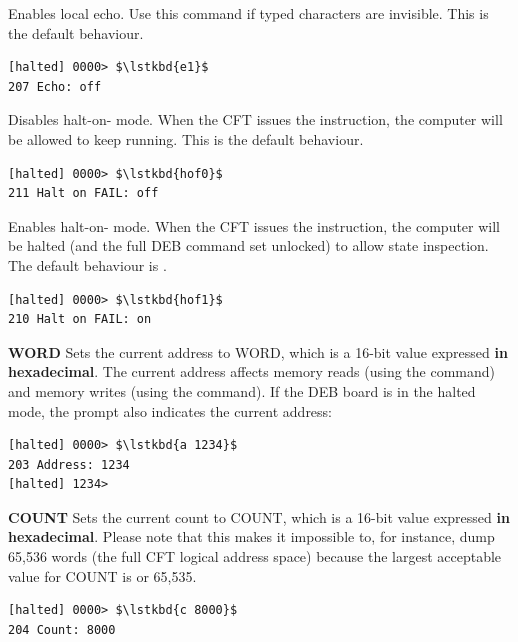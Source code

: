 \begin{description}
\item{\bfseries{}} Enables local echo. Use this command if typed
  characters are invisible. This is the default behaviour.

{\small
\begin{lstlisting}[style=deb]
[halted] 0000> $\lstkbd{e1}$
207 Echo: off
\end{lstlisting}
}


\item{\bfseries{}} Disables halt-on- mode. When the CFT
  issues the  instruction, the computer will be allowed to
  keep running. This is the default behaviour.

{\small
\begin{lstlisting}[style=deb]
[halted] 0000> $\lstkbd{hof0}$
211 Halt on FAIL: off
\end{lstlisting}
}


\item{\bfseries{}} Enables halt-on- mode. When the CFT
  issues the  instruction, the computer will be halted (and
  the full \gls{DEB} command set unlocked) to allow state
  inspection. The default behaviour is .

{\small
\begin{lstlisting}[style=deb]
[halted] 0000> $\lstkbd{hof1}$
210 Halt on FAIL: on
\end{lstlisting}
}


\item{\bfseries{} WORD} Sets the current address to WORD, which is a
  16-bit value expressed {\bfseries in hexadecimal}. The current address
  affects memory reads (using the  command) and memory writes
  (using the  command). If the \gls{DEB} board is in the
  halted mode, the prompt also indicates the current address:

{\small
\begin{lstlisting}[style=deb]
[halted] 0000> $\lstkbd{a 1234}$
203 Address: 1234
[halted] 1234> 
\end{lstlisting}
}


\item{\bfseries{} COUNT} Sets the current count to COUNT, which is a
  16-bit value expressed {\bfseries in hexadecimal}. Please note that this
  makes it impossible to, for instance, dump 65,536 words (the full
  CFT logical address space) because the largest acceptable value for
  COUNT is  or 65,535.

{\small
\begin{lstlisting}[style=deb]
[halted] 0000> $\lstkbd{c 8000}$
204 Count: 8000
\end{lstlisting}
}



\end{description}
